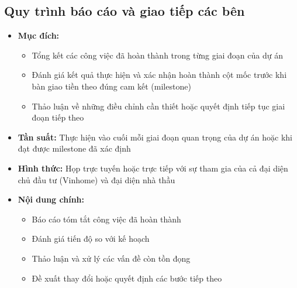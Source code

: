 \subsection{Quy trình báo cáo và giao tiếp các bên}
\begin{itemize}
    \item \textbf{Mục đích:}
    \begin{itemize}
        \item Tổng kết các công việc đã hoàn thành trong từng giai đoạn của dự án
        \item Đánh giá kết quả thực hiện và xác nhận hoàn thành cột mốc trước khi bàn giao tiền theo đúng cam kết (milestone)
        \item Thảo luận về những điều chỉnh cần thiết hoặc quyết định tiếp tục giai đoạn tiếp theo
    \end{itemize}
    \item \textbf{Tần suất:} Thực hiện vào cuối mỗi giai đoạn quan trọng của dự án hoặc khi đạt được milestone đã xác định
    \item \textbf{Hình thức:} Họp trực tuyến hoặc trực tiếp với sự tham gia của cả đại diện chủ đầu tư (Vinhome) và đại diện nhà thầu
    \item \textbf{Nội dung chính:}
    \begin{itemize}
        \item Báo cáo tóm tắt công việc đã hoàn thành
        \item Đánh giá tiến độ so với kế hoạch
        \item Thảo luận và xử lý các vấn đề còn tồn đọng
        \item Đề xuất thay đổi hoặc quyết định các bước tiếp theo
    \end{itemize}
\end{itemize}
